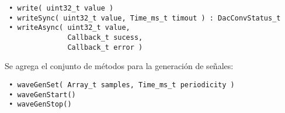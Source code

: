 
\begin{verbatim}
 • write( uint32_t value )
 • writeSync( uint32_t value, Time_ms_t timout ) : DacConvStatus_t
 • writeAsync( uint32_t value, 
               Callback_t sucess, 
               Callback_t error )
\end{verbatim}

Se agrega el conjunto de métodos para la generación de señales:

\begin{verbatim}
 • waveGenSet( Array_t samples, Time_ms_t periodicity )
 • waveGenStart()
 • waveGenStop()
\end{verbatim}

